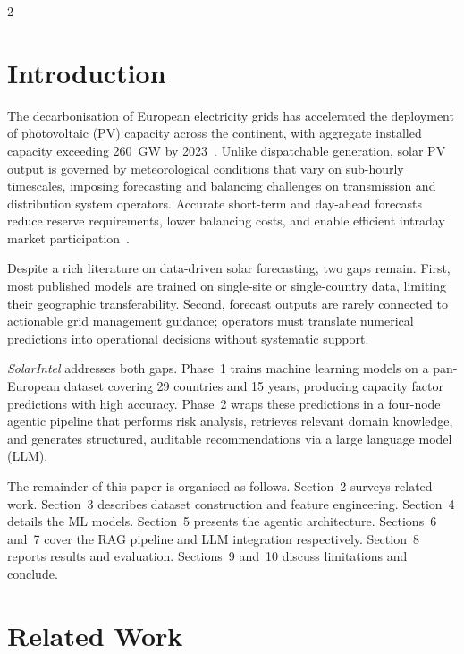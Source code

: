 \documentclass[11pt]{article}
\begin{document}
\begin{multicols}{2}
\section{Introduction}

The decarbonisation of European electricity grids has accelerated the deployment
of photovoltaic (PV) capacity across the continent, with aggregate installed
capacity exceeding 260~GW by 2023~\cite{irena2023}. Unlike dispatchable
generation, solar PV output is governed by meteorological conditions that vary
on sub-hourly timescales, imposing forecasting and balancing challenges on
transmission and distribution system operators. Accurate short-term and
day-ahead forecasts reduce reserve requirements, lower balancing costs, and
enable efficient intraday market participation~\cite{antonanzas2016}.

Despite a rich literature on data-driven solar forecasting, two gaps remain.
First, most published models are trained on single-site or single-country data,
limiting their geographic transferability. Second, forecast outputs are rarely
connected to actionable grid management guidance; operators must translate
numerical predictions into operational decisions without systematic support.

\textit{SolarIntel} addresses both gaps. Phase~1 trains machine learning models
on a pan-European dataset covering 29 countries and 15 years, producing
capacity factor predictions with high accuracy. Phase~2 wraps these predictions
in a four-node agentic pipeline that performs risk analysis, retrieves relevant
domain knowledge, and generates structured, auditable recommendations via a
large language model (LLM).

The remainder of this paper is organised as follows. Section~2 surveys related
work. Section~3 describes dataset construction and feature engineering.
Section~4 details the ML models. Section~5 presents the agentic architecture.
Sections~6 and~7 cover the RAG pipeline and LLM integration respectively.
Section~8 reports results and evaluation. Sections~9 and~10 discuss limitations
and conclude.

\section{Related Work}


\end{multicols}
\end{document}
